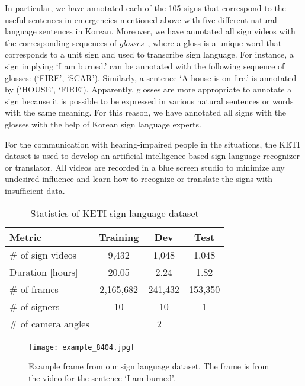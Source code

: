 \documentclass[10pt,twocolumn,letterpaper]{article}
\begin{document}
In particular, we have annotated each of the 105 signs that correspond to the useful sentences in emergencies mentioned above with five different natural language sentences in Korean.
Moreover, we have annotated all sign videos with the corresponding sequences of {\em glosses}~\cite{Liddell03}, where a gloss is a unique word that corresponds to a unit sign and used to transcribe sign language. For instance, a sign implying `I am burned.' can be annotated with the following sequence of glosses: (`FIRE', `SCAR'). Similarly, a sentence `A house is on fire.' is annotated by (`HOUSE', `FIRE').
Apparently, glosses are more appropriate to annotate a sign because it is possible to be expressed in various natural sentences or words with the same meaning. For this reason, we have annotated all signs with the glosses with the help of Korean sign language experts.

For the communication with hearing-impaired people in the situations, the KETI dataset is used to develop an artificial intelligence-based sign language recognizer or translator. All videos are recorded in a blue screen studio to minimize any undesired influence and learn how to recognize or translate the signs with insufficient data.










\begin{table}[htb]\label{tab:dataset}
\centering
\begin{tabular}{@{  }p{3.1cm}ccc@{  }}
\toprule
Metric  & Training & Dev & Test\\ \midrule
\# of sign videos  & 9,432 & 1,048 & 1,048  \\
Duration [hours]  & 20.05 & 2.24 & 1.82\\
\# of frames  & 2,165,682 & 241,432 & 153,350\\
\# of signers  & 10 & 10 & 1\\
\# of camera angles  & \multicolumn{3}{c}{2}\\
\bottomrule
\end{tabular}
\caption{Statistics of KETI sign language dataset}
\end{table}



\begin{figure}[htb]\label{fig:example_frame}
\centering
\texttt{[image: example\_8404.jpg]}
\caption{Example frame from our sign language dataset. The frame is from the video for the sentence `I am burned'.}
\end{figure}
\end{document}

